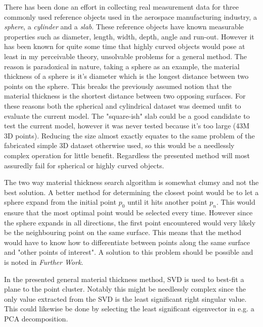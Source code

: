 \documentclass[%
]{USN-MSc}
\begin{document}
There has been done an effort in collecting real measurement data for three commonly used reference objects used in the aerospace manufacturing industry, a \textit{sphere}, a \textit{cylinder} and a \textit{slab}. These reference objects have known measurable properties such as diameter, length, width, depth, angle and run-out. However it has been known for quite some time that highly curved objects would pose at least in my perceivable theory, unsolvable problems for a general method. The reason is paradoxical in nature, taking a sphere as an example, the material thickness of a sphere is it's diameter which is the longest distance between two points on the sphere. This breaks the previously assumed notion that the material thickness is the shortest distance between two opposing surfaces. For these reasons both the spherical and cylindrical dataset was deemed unfit to evaluate the current model. The "square-ish" slab could be a good candidate to test the current model, however it was never tested because it's too large (43M 3D points). Reducing the size almost exactly equates to the same problem of the fabricated simple 3D dataset otherwise used, so this would be a needlessly complex operation for little benefit. Regardless the presented method will most assuredly fail for spherical or highly curved objects.

The two way material thickness search algorithm is somewhat clumsy and not the best solution. A better method for determining the closest point would be to let a sphere expand from the initial point \(p_0\) until it hits another point \(p_n\). This would ensure that the most optimal point would be selected every time. However since the sphere expands in all directions, the first point encountered would very likely be the neighbouring point on the same surface. This means that the method would have to know how to differentiate between points along the same surface and "other points of interest". A solution to this problem should be possible and is noted in \textit{Further Work}.

In the presented general material thickness method, SVD is used to best-fit a plane to the point cluster. Notably this might be needlessly complex since the only value extracted from the SVD is the least significant right singular value. This could likewise be done by selecting the least significant eigenvector in e.g. a PCA decomposition.
\end{document}
